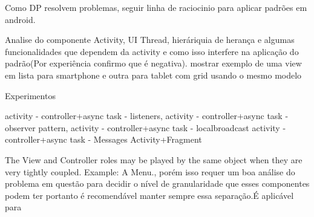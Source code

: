 Como DP resolvem problemas, seguir linha de raciocinio para aplicar padrões em
android.


Analise do componente Activity, UI Thread, hieráriquia de herança e algumas
funcionalidades que dependem da activity e como isso interfere na aplicação do
padrão(Por experiência confirmo que é negativa). mostrar exemplo de uma view em
lista para smartphone e outra para tablet com grid usando o mesmo modelo

Experimentos

activity - controller+async task - listeners,
activity - controller+async task - observer pattern,
activity - controller+async task - localbroadcast
activity - controller+async task - Messages
Activity+Fragment


 The View and Controller roles may be played by the 
same object when they are very tightly coupled. Example: A Menu., porém isso
requer um boa análise do problema em questão para decidir o nível de
granularidade que esses componentes podem ter portanto é recomendável manter
sempre essa separação.É aplicável para 


